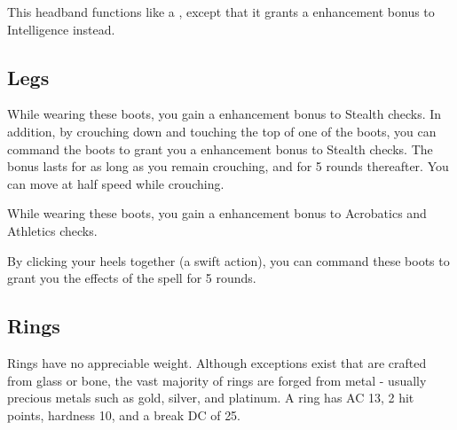  This headband functions like a , except that it grants a  enhancement bonus to Intelligence instead.


\subsection{Legs}

 While wearing these boots, you gain a  enhancement bonus to Stealth checks. In addition, by crouching down and touching the top of one of the boots, you can command the boots to grant you a  enhancement bonus to Stealth checks. The bonus lasts for as long as you remain crouching, and for 5 rounds thereafter. You can move at half speed while crouching. 


 While wearing these boots, you gain a  enhancement bonus to Acrobatics and Athletics checks.


 By clicking your heels together (a swift action), you can command these boots to grant you the effects of the  spell for 5 rounds.


\subsection{Rings}

 Rings have no appreciable weight. Although exceptions exist that are crafted from glass or bone, the vast majority of rings are forged from metal - usually precious metals such as gold, silver, and platinum. A ring has AC 13, 2 hit points, hardness 10, and a break DC of 25.

